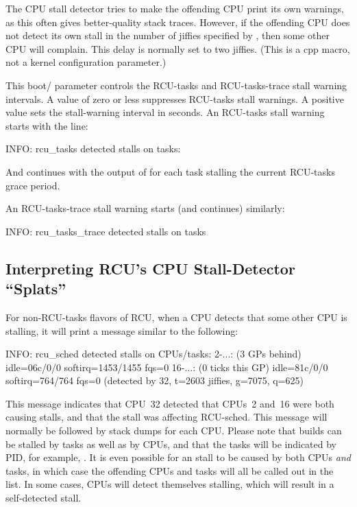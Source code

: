 \begin{description}[style=nextline]
\item[\tco{RCU_STALL_RAT_DELAY}]
	The CPU stall detector tries to make the offending CPU print its
	own warnings, as this often gives better-quality stack traces.
	However, if the offending CPU does not detect its own stall in
	the number of jiffies specified by , then
	some other CPU will complain.
	This delay is normally set to
	two jiffies.
	(This is a cpp macro, not a kernel configuration
	parameter.)

\item[\tco{rcupdate.rcu_task_stall_timeout}]
	This boot/ parameter controls the RCU-tasks and
	RCU-tasks-trace stall warning intervals.
	A value of zero or less
	suppresses RCU-tasks stall warnings.
	A positive value sets the
	stall-warning interval in seconds.
	An RCU-tasks stall warning
	starts with the line:

\begin{VerbatimU}[gobble=2]
		INFO: rcu_tasks detected stalls on tasks:
\end{VerbatimU}

	And continues with the output of  for each
	task stalling the current RCU-tasks grace period.

	An RCU-tasks-trace stall warning starts (and continues) similarly:

\begin{VerbatimU}[gobble=2]
		INFO: rcu_tasks_trace detected stalls on tasks
\end{VerbatimU}
\end{description}

\subsection{Interpreting RCU's CPU Stall-Detector ``Splats''}

For non-RCU-tasks flavors of RCU, when a CPU detects that some other
CPU is stalling, it will print a message similar to the following:

\begin{VerbatimU}
	INFO: rcu_sched detected stalls on CPUs/tasks:
	2-...: (3 GPs behind) idle=06c/0/0 softirq=1453/1455 fqs=0
	16-...: (0 ticks this GP) idle=81c/0/0 softirq=764/764 fqs=0
	(detected by 32, t=2603 jiffies, g=7075, q=625)
\end{VerbatimU}

This message indicates that CPU~32 detected that CPUs~2 and~16 were both
causing stalls, and that the stall was affecting RCU-sched.
This message
will normally be followed by stack dumps for each CPU\@.
Please note that
 builds can be stalled by tasks as well as by CPUs, and that
the tasks will be indicated by PID, for example, .
It is even
possible for an  stall to be caused by both CPUs \emph{and} tasks,
in which case the offending CPUs and tasks will all be called out in the list.
In some cases, CPUs will detect themselves stalling, which will result
in a self-detected stall.

